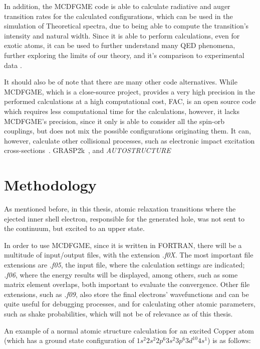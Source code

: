 In addition, the \gls{MCDFGME} code is able to calculate radiative and auger transition rates for the calculated configurations, which can be used in the simulation of Theoretical spectra, due to being able to compute the transition's intensity and natural width.
Since it is able to perform calculations, even for exotic atoms, it can be used to further understand many QED phenomena, further exploring the limits of our theory, and it's comparison to experimental data \cite{Paul2021}.

It should also be of note that there are many other code alternatives. While \gls{MCDFGME}, which is a close-source project, provides a very high precision in the performed calculations at a high computational cost, \gls{FAC}, is an open source code which requires less computational time for the calculations, however, it lacks \gls{MCDFGME}'s precision, since it only is able to consider all the spin-orb couplings, but does not mix the possible configurations originating them. 
It can, however, calculate other collisional processes, such as electronic impact excitation cross-sections~\cite{FAC}. \gls{GRASP2k}~\cite{GRASP2K}, and \textit{AUTOSTRUCTURE}~\cite{AUTOSTRUCTURE}


\section{Methodology}

As mentioned before, in this thesis, atomic relaxation transitions where the ejected inner shell electron, responsible for the generated hole, was not sent to the continuum, but excited to an upper state.

In order to use \gls{MCDFGME}, since it is written in FORTRAN, there will be a multitude of input/output files, with the extension \textit{.f0X}. The most important file extensions are \textit{.f05}, the input file, where the calculation settings are indicated; \textit{.f06}, where the energy results will be displayed, among others, such as some matrix element overlaps, both important to evaluate the convergence.
 Other file extensions, such as \textit{.f09}, also store the final electrons' wavefunctions and can be quite useful for debugging processes, and for calculating other atomic parameters, such as shake probabilities, which will not be of relevance as of this thesis.

 An example of a normal atomic structure calculation for an excited Copper atom (which has a ground state configuration of $1s^2 2s^2 2p^6 3s^2 3p^6 3d^{10} 4s^1$) is as follows:


